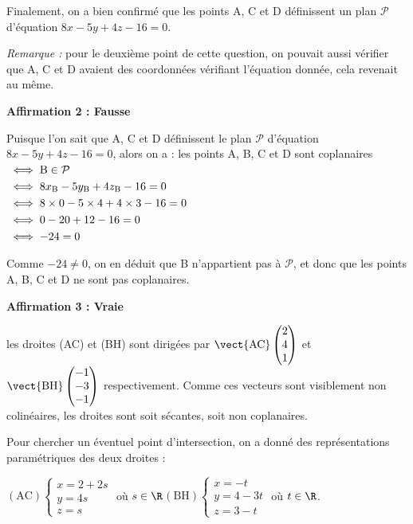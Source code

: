 Finalement, on a bien confirmé que les points A, C et D définissent un plan $\mathcal{P}$ d'équation $8 x-5 y+4 z-16=0$.

\emph{Remarque :} pour le deuxième point de cette question, on pouvait aussi vérifier que A, C et D avaient des coordonnées vérifiant l'équation donnée, cela revenait au même.

\medskip

\textbf{Affirmation 2 : Fausse}

Puisque l'on sait que A, C et D définissent le plan $\mathcal{P}$ d'équation $8x-5y+4z-16 = 0$, alors on a :
les points A, B, C et D sont coplanaires $\aligned[t] &\iff \mathrm{B} \in \mathcal{P}\\
&\iff 8x_\mathrm{B}-5y_\mathrm{B}+4z_\mathrm{B}-16 =0\\
&\iff 8\times 0 - 5\times 4 + 4\times 3 - 16 = 0\\
&\iff 0 - 20 + 12 - 16 = 0\\
&\iff -24 = 0\endaligned$

Comme $-24\neq 0$, on en déduit que B n'appartient pas à $\mathcal{P}$, et donc que les points A, B, C et D ne sont pas coplanaires.

\medskip

\textbf{Affirmation 3 : Vraie}

les droites (AC) et (BH) sont dirigées par $\vect{\mathrm{AC}}  \begin{pmatrix} 2\\4\\1 \end{pmatrix}$ et $\vect{\mathrm{BH}} \begin{pmatrix} -1\\-3\\-1 \end{pmatrix}$ respectivement. Comme ces vecteurs sont visiblement non colinéaires, les droites sont soit sécantes, soit non coplanaires.

Pour chercher un éventuel point d'intersection, on a donné des représentations paramétriques des deux droites :

$(\mathrm{AC}) \begin{cases} x = 2+2s\\y = 4s\\z = s \end{cases}$ où $s\in \R$\qquad $(\mathrm{BH})\begin{cases} x =  - t\\y = 4 - 3t\\z=3 - t\end{cases}$ où $t\in \R$.

